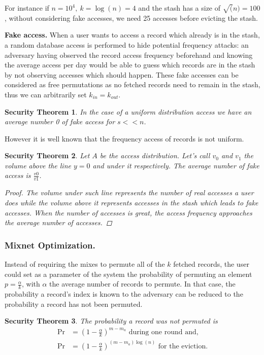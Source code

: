 \documentclass[a4paper]{article}
\newtheorem{secthm}{Security Theorem}
\begin{document}
For instance if $n=10^4,\ k=\log(n)=4$ and the stash has a size of $\sqrt(n)=100$, without considering fake accesses, we need 25 accesses before evicting the stash.

\textbf{Fake access.}
When a user wants to access a record which already is in the stash, a random database access is performed to hide potential frequency attacks: an adversary having observed the record access frequency beforehand and knowing the average access per day would be able to guess which records are in the stash by not observing accesses which should happen.
These fake accesses can be considered as free permutations as no fetched records need to remain in the stash, thus we can arbitrarily set $k_{in}=k_{out}$.

\begin{secthm}
In the case of a uniform distribution access we have an average number 0 of fake access for $s<<n$.
\end{secthm}

However it is well known that the frequency access of records is not uniform.
\begin{secthm}
Let $A$ be the access distribution. Let's call $v_0$ and $v_1$ the volume above the line $y=0$ and under it respectively.
The average number of fake access is $ \frac{v0}{v1}$.
\begin{proof}
 The volume under such line represents the number of real accesses a user does while the volume above it represents accesses in the stash which leads to fake accesses.
 When the number of accesses is great, the access frequency approaches the average number of accesses.
\end{proof}
\end{secthm}

\subsubsection{Mixnet Optimization.}

Instead of requiring the mixes to permute all of the $k$ fetched records, the user could set as a parameter of the system the probability of permuting an element $p=\frac{\alpha}{k}$, with $\alpha$ the average number of records to permute.
In that case, the probability a record's index is known to the adversary can be reduced to the probability a record has not been permuted.

\begin{secthm}
 The probability a record was not permuted is
 \begin{align*}
 \Pr &= \left ( 1 - \frac{\alpha}{k} \right )^{m-m_a} \text{ during one round and,} \\
 \Pr &= \left ( 1 - \frac{\alpha}{k} \right )^{(m-m_a)\log(n)} \text{ for the eviction.}
 \end{align*} 
\end{secthm}
\end{document}
